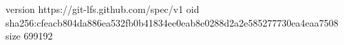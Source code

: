 version https://git-lfs.github.com/spec/v1
oid sha256:cfeacb804da886ea532fb0b41834ee0eab8e0288d2a2e585277730ea4eaa7508
size 699192
